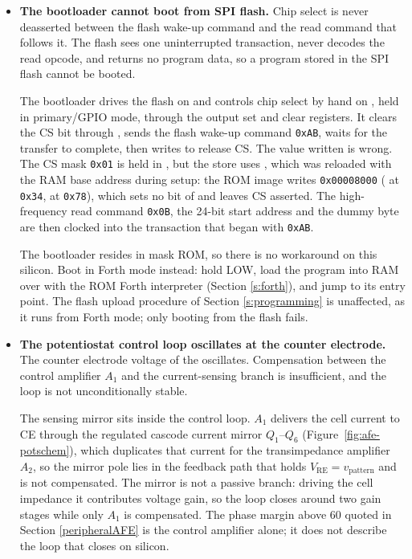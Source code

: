\documentclass[11pt,pdftex,portrait,letterpaper]{article}
\begin{document}
\begin{itemize}
	There is no workaround on this silicon --- the trigger waveform is fixed in the gate
	netlist. Continuous-measurement mode () still streams conversions
	back to back, so the only loss is sample rate. Corrected in the RTL for subsequent
	chips.

	\item \textbf{The bootloader cannot boot from SPI flash.}
	Chip select is never deasserted between the flash wake-up command and the read
	command that follows it. The flash sees one uninterrupted transaction, never decodes
	the read opcode, and returns no program data, so a program stored in the SPI flash
	cannot be booted.

	The bootloader drives the flash on  and controls chip select by hand
	on , held in primary/GPIO mode, through the  output set
	and clear registers. It clears the CS bit through , sends the flash
	wake-up command \texttt{0xAB}, waits for the transfer to complete, then writes
	 to release CS. The value written is wrong. The CS mask
	\texttt{0x01} is held in , but the store uses , which was
	reloaded with the RAM base address during setup: the ROM image writes
	\texttt{0x00008000} ( at \texttt{0x34}, 
	at \texttt{0x78}), which sets no bit of  and leaves CS asserted. The
	high-frequency read command \texttt{0x0B}, the 24-bit start address and the dummy byte
	are then clocked into the transaction that began with \texttt{0xAB}.

	The bootloader resides in mask ROM, so there is no workaround on this silicon. Boot in
	Forth mode instead: hold  LOW, load the program into RAM over
	 with the ROM Forth interpreter (Section \ref{s:forth}), and jump to
	its entry point. The flash upload procedure of Section \ref{s:programming} is
	unaffected, as it runs from Forth mode; only booting from the flash fails.

	\item \textbf{The potentiostat control loop oscillates at the counter electrode.}
	The counter electrode voltage of the  oscillates. Compensation between
	the control amplifier $A_1$ and the current-sensing branch is insufficient, and the
	loop is not unconditionally stable.

	The sensing mirror sits inside the control loop. $A_1$ delivers the cell current to CE
	through the regulated cascode current mirror $Q_1$--$Q_6$
	(Figure~\ref{fig:afe-potschem}), which duplicates that current for the transimpedance
	amplifier $A_2$, so the mirror pole lies in the feedback path that holds
	$V_\mathrm{RE} = v_\mathrm{pattern}$ and is not compensated. The mirror is not a
	passive branch: driving the cell impedance it contributes voltage gain, so the loop
	closes around two gain stages while only $A_1$ is compensated. The phase margin above
	60\degree{} quoted in Section \ref{peripheralAFE} is the control amplifier alone; it
	does not describe the loop that closes on silicon.


\end{itemize}
\end{document}
